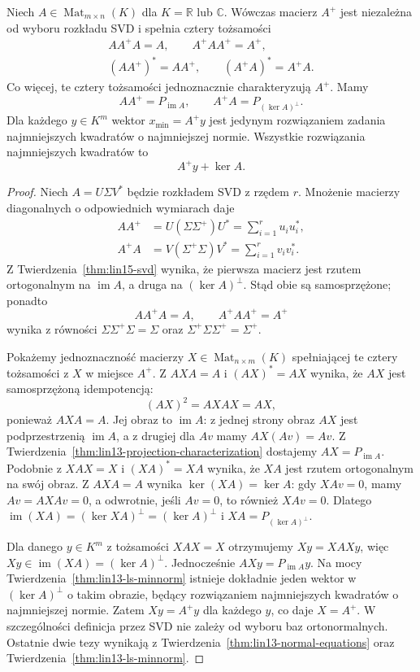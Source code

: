 \begin{twierdzenie}
\label{thm:lin15-pseudoinverse}
Niech \(A\in\operatorname{Mat}_{m\times n}(K)\)
dla \(K=\mathbb R\) lub \(\mathbb C\).
Wówczas macierz \(A^+\)
jest niezależna od wyboru
rozkładu SVD i spełnia
cztery tożsamości
\[
 \begin{gathered}
 AA^+A=A,\qquad A^+AA^+=A^+,\\
 (AA^+)^*=AA^+,\qquad
 (A^+A)^*=A^+A.
 \end{gathered}
\]
Co więcej, te cztery
tożsamości jednoznacznie
charakteryzują \(A^+\).
Mamy
\[
 AA^+=P_{\operatorname{im}A},
 \qquad
 A^+A=P_{(\ker A)^\perp}.
\]
Dla każdego \(y\in K^m\)
wektor \(x_{\min}=A^+y\)
jest jedynym rozwiązaniem
zadania najmniejszych kwadratów
o najmniejszej normie.
Wszystkie rozwiązania
najmniejszych kwadratów to
\[
 A^+y+\ker A.
\]
\end{twierdzenie}
\begin{proof}
Niech \(A=U\Sigma V^*\) będzie
rozkładem SVD z rzędem \(r\).
Mnożenie macierzy diagonalnych
o odpowiednich wymiarach daje
\[
 \begin{aligned}
 AA^+&=U(\Sigma\Sigma^+)U^*
       =\sum_{i=1}^r u_i u_i^*,\\
 A^+A&=V(\Sigma^+\Sigma)V^*
       =\sum_{i=1}^r v_i v_i^*.
 \end{aligned}
\]
Z
Twierdzenia~\ref{thm:lin15-svd}
wynika, że pierwsza
macierz jest rzutem ortogonalnym
na \(\operatorname{im}A\),
a druga na \((\ker A)^\perp\).
Stąd obie są samosprzężone;
ponadto
\[
 AA^+A=A,\qquad
 A^+AA^+=A^+
\]
wynika z równości
\(\Sigma\Sigma^+\Sigma=\Sigma\)
oraz
\(\Sigma^+\Sigma\Sigma^+=\Sigma^+\).

Pokażemy jednoznaczność
macierzy \(X\in\operatorname{Mat}_{n\times m}(K)\)
spełniającej te cztery tożsamości
z \(X\) w miejsce \(A^+\).
Z \(AXA=A\) i \((AX)^*=AX\)
wynika, że \(AX\) jest
samosprzężoną idempotencją:
\[
 (AX)^2=AXAX=AX,
\]
ponieważ \(AXA=A\).
Jej obraz to \(\operatorname{im}A\):
z jednej strony obraz \(AX\)
jest podprzestrzenią
\(\operatorname{im}A\),
a z drugiej dla \(Av\)
mamy \(AX(Av)=Av\).
Z
Twierdzenia~\ref{thm:lin13-projection-characterization}
dostajemy
\(AX=P_{\operatorname{im}A}\).
Podobnie z \(XAX=X\)
i \((XA)^*=XA\)
wynika, że \(XA\)
jest rzutem ortogonalnym
na swój obraz. Z
\(AXA=A\) wynika
\(\ker(XA)=\ker A\):
gdy \(XA v=0\), mamy
\(Av=AXAv=0\), a odwrotnie, jeśli \(Av=0\),
to również \(XAv=0\).
Dlatego
\(\operatorname{im}(XA)
=(\ker XA)^\perp=(\ker A)^\perp\)
i
\(XA=P_{(\ker A)^\perp}\).

Dla danego \(y\in K^m\)
z tożsamości \(XAX=X\)
otrzymujemy
\(Xy=XAXy\), więc
\(Xy\in\operatorname{im}(XA)
=(\ker A)^\perp\).
Jednocześnie
\(AXy=P_{\operatorname{im}A}y\).
Na mocy
Twierdzenia~\ref{thm:lin13-ls-minnorm}
istnieje dokładnie jeden
wektor w \((\ker A)^\perp\)
o takim obrazie,
będący rozwiązaniem
najmniejszych kwadratów
o najmniejszej normie.
Zatem \(Xy=A^+y\)
dla każdego \(y\),
co daje \(X=A^+\).
W szczególności
definicja przez SVD
nie zależy od wyboru
baz ortonormalnych.
Ostatnie dwie tezy
wynikają z
Twierdzenia~\ref{thm:lin13-normal-equations}
oraz
Twierdzenia~\ref{thm:lin13-ls-minnorm}.
\end{proof}

